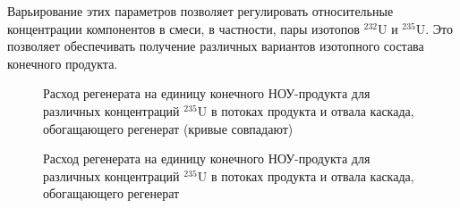 Варьирование этих параметров позволяет регулировать относительные концентрации компонентов в смеси, в частности, пары изотопов $^{232}$U и $^{235}$U. Это позволяет обеспечивать получение различных вариантов изотопного состава конечного продукта. 

\begin{figure}[ht]
  \caption{Расход регенерата на единицу конечного НОУ-продукта для различных концентраций $^{235}$U в потоках продукта и отвала каскада, обогащающего регенерат (кривые совпадают)}\label{Figure_10}
\end{figure}

\begin{figure}[ht]
  \caption{Расход регенерата на единицу конечного НОУ-продукта для различных концентраций $^{235}$U в потоках продукта и отвала каскада, обогащающего регенерат}\label{Figure_10_1}
\end{figure}

